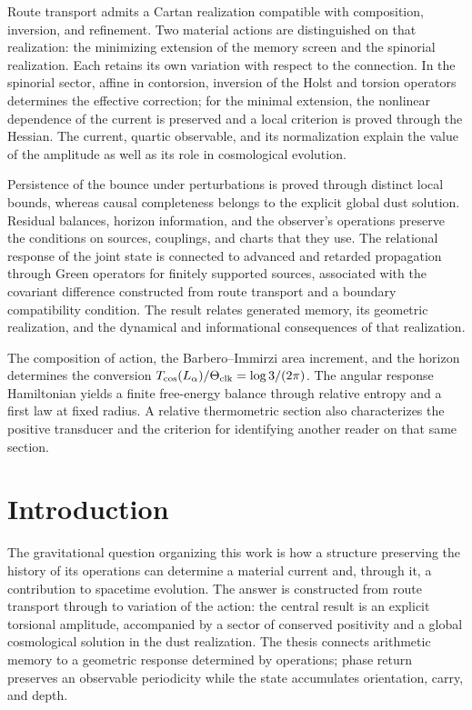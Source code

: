 Route transport admits a Cartan realization compatible with composition,
inversion, and refinement. Two material actions are distinguished on that
realization: the minimizing extension of the memory screen and the
spinorial realization. Each retains its own variation with respect to
the connection. In the spinorial sector, affine in contorsion, inversion
of the Holst and torsion operators determines the effective correction;
for the minimal extension, the nonlinear dependence of the current is
preserved and a local criterion is proved through the Hessian. The
current, quartic observable, and its normalization explain the value of
the amplitude as well as its role in cosmological evolution.

Persistence of the bounce under perturbations is proved through distinct
local bounds, whereas causal completeness belongs to the explicit global
dust solution. Residual balances, horizon information, and the observer's
operations preserve the conditions on sources, couplings, and charts
that they use. The relational response of the joint state is connected
to advanced and retarded propagation through Green operators for finitely
supported sources, associated with the covariant difference constructed
from route transport and a boundary
compatibility condition. The result relates generated memory, its
geometric realization, and the dynamical and informational consequences
of that realization.

The composition of action, the Barbero--Immirzi area increment, and the
horizon determines the conversion
\(T_{\rm cos}(L_\alpha)/\Theta_{\rm clk}=\log3/(2\pi)\).
The angular response Hamiltonian yields a finite free-energy balance
through relative entropy and a first law at fixed radius. A relative
thermometric section also characterizes the positive transducer and
the criterion for identifying another reader on that same section.
\par\endgroup
\clearpage

\section{Introduction}
\label{vii:sec:introduccion}

The gravitational question organizing this work is how a structure
preserving the history of its operations can determine a material current
and, through it, a contribution to spacetime evolution. The answer is
constructed from route transport through to variation of the action:
the central result is an explicit torsional amplitude, accompanied by a
sector of conserved positivity and a global cosmological solution in the
dust realization. The thesis connects arithmetic memory to a geometric
response determined by operations; phase return preserves an observable
periodicity while the state accumulates orientation, carry, and depth.

